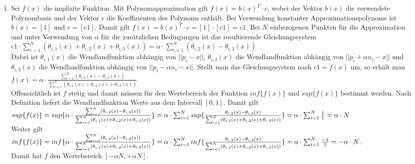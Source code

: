 \documentclass[a4paper,10pt]{scrartcl}
\begin{document}
\begin{enumerate}[1.]
\item Sei $f(x)$ die implizite Funktion. Mit Polynomapproximation gilt $f(x) = b(x)^T \cdot c$, wobei der Vektor $b(x)$ die verwendete Polynombasis und der Vektor $c$ die Koeffizienten des Polynoms enthält. Bei Verwendung konstanter Approximationspolynome ist $b(x) = [1]$ und $c = [c1]$. Damit gilt $f(x) = b(x)^T \cdot c = [1] \cdot [c1] = c1$. Bei $N$ einbezogenen Punkten für die Approximation und unter Verwendung von $\alpha$ für die zusätzlichen Bedingungen ist das resultierende Gleichungssystem \\
$c1 \cdot \sum_{i=1}^N (\theta_{i,1}(x) + \theta_{i,2}(x) + \theta_{i,3}(x)) = \alpha \cdot \sum_{i=1}^N (\theta_{i,2}(x) - \theta_{i,3}(x))$ \\
Dabei ist $\theta_{i,1}(x)$ die Wendlandfunktion abhängig von $||p_i - x||$, $\theta_{i,2}(x)$ die Wendlandfunktion abhängig von $||p_i + \alpha n_i - x||$ und $\theta_{i,3}(x)$ die Wendlandfunktion abhängig von $||p_i - \alpha n_i - x||$. Stellt man das Gleichungssystem nach $c1 = f(x)$ um, so erhält man \\
$f(x) = \alpha \cdot \frac{\sum_{i=1}^N (\theta_{i,2}(x) - \theta_{i,3}(x))}{\sum_{i=1}^N (\theta_{i,1}(x) + \theta_{i,2}(x) + \theta_{i,3}(x))}$ \\ Offensichtlich ist $f$ stetig und damit müssen für den Wertebereich der Funktion $inf\{f(x)\}$ und $sup\{f(x)\}$ bestimmt werden. Nach Definition liefert die Wendlandfunktion Werte aus dem Intervall $[0, 1]$. Damit gilt \\
$sup\{f(x)\} \\
= sup\{\alpha \cdot \frac{\sum_{i=1}^N (\theta_{i,2}(x) - \theta_{i,3}(x))}{\sum_{i=1}^N (\theta_{i,1}(x) + \theta_{i,2}(x) + \theta_{i,3}(x))}\} \\
= \alpha \cdot \sum_{i=1}^N sup\{\frac{\theta_{i,2}(x) - \theta_{i,3}(x)}{\sum_{i=1}^N (\theta_{i,1}(x) + \theta_{i,2}(x) + \theta_{i,3}(x))}\} \\
= \alpha \cdot \sum_{i=1}^N \frac{1}{1} \\
= \alpha \cdot N$ \\
Weiter gilt \\
$inf\{f(x)\} \\
= inf\{\alpha \cdot \frac{\sum_{i=1}^N (\theta_{i,2}(x) - \theta_{i,3}(x))}{\sum_{i=1}^N (\theta_{i,1}(x) + \theta_{i,2}(x) + \theta_{i,3}(x))}\} \\
= \alpha \cdot \sum_{i=1}^N inf\{\frac{\theta_{i,2}(x) - \theta_{i,3}(x)}{\sum_{i=1}^N (\theta_{i,1}(x) + \theta_{i,2}(x) + \theta_{i,3}(x))}\} \\
= \alpha \cdot \sum_{i=1}^N \frac{-1}{1} \\
= - \alpha \cdot N$. \\
Damit hat $f$ den Wertebereich $[- \alpha N, + \alpha N]$.


\end{enumerate}
\end{document}
